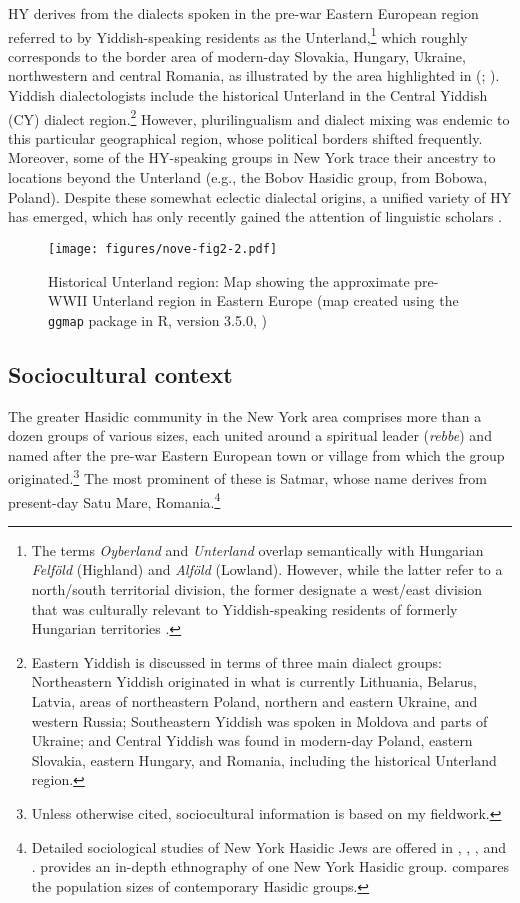\documentclass[output=paper]{langsci/langscibook}
\begin{document}
HY derives from the dialects spoken in the pre-war Eastern European region referred to by Yiddish-speaking residents as the Unterland,\footnote{The terms \textit{Oyberland} and \textit{Unterland} overlap semantically with Hungarian \textit{Felföld} (Highland) and \textit{Alföld} (Lowland). However, while the latter refer to a north/south territorial division, the former designate a west/east division that was culturally relevant to Yiddish-speaking residents of formerly Hungarian territories \citep{Weinreich1964}.} which roughly corresponds to the border area of modern-day Slovakia, Hungary, Ukraine, northwestern and central Romania, as illustrated by the area highlighted in  (\citealt{Krogh2012}; \citealt{Weinreich1964}). Yiddish dialectologists include the historical Unterland in the Central Yiddish (CY) dialect region.\footnote{Eastern Yiddish is discussed in terms of three main dialect groups: Northeastern Yiddish originated in what is currently Lithuania, Belarus, Latvia, areas of northeastern Poland, northern and eastern Ukraine, and western Russia; Southeastern Yiddish was spoken in Moldova and parts of Ukraine; and Central Yiddish was found in modern-day Poland, eastern Slovakia, eastern Hungary, and Romania, including the historical Unterland region.} However, plurilingualism and dialect mixing was endemic to this particular geographical region, whose political borders shifted frequently. Moreover, some of the HY-speaking groups in New York trace their ancestry to locations beyond the Unterland (e.g., the Bobov Hasidic group, from Bobowa, Poland). Despite these somewhat eclectic dialectal origins, a unified variety of HY has emerged, which has only recently gained the attention of linguistic scholars \citep{Nove2018a, SadockMasor2018}. 

\begin{figure}
\texttt{[image: figures/nove-fig2-2.pdf]}
\caption{Historical Unterland region: Map showing the approximate pre-WWII Unterland region in Eastern Europe (map created using the \texttt{ggmap} package \citep{KahleWickham2013} in R, version 3.5.0, \citealt{RCore2017})\label{fig:nove:2}}
\end{figure}

 
\subsection{Sociocultural context}
\label{sec:nove:2.2}


The greater Hasidic community in the New York area comprises more than a dozen groups of various sizes, each united around a spiritual leader (\textit{rebbe}) and named after the pre-war Eastern European town or village from which the group originated.\footnote{Unless otherwise cited, sociocultural information is based on my fieldwork.} The most prominent of these is Satmar, whose name derives from present-day Satu Mare, Romania.\footnote{Detailed sociological studies of New York Hasidic Jews are offered in \citet{Heilman1992, Heilman2017}, \citet{Kranzler1995}, \citet{Poll1962}, and \citet{Rubin1972, Rubin1997}. \citet{Fader2009} provides an in-depth ethnography of one New York Hasidic group. \citet{Wodzinski2018} compares the population sizes of contemporary Hasidic groups.} 
\end{document}
